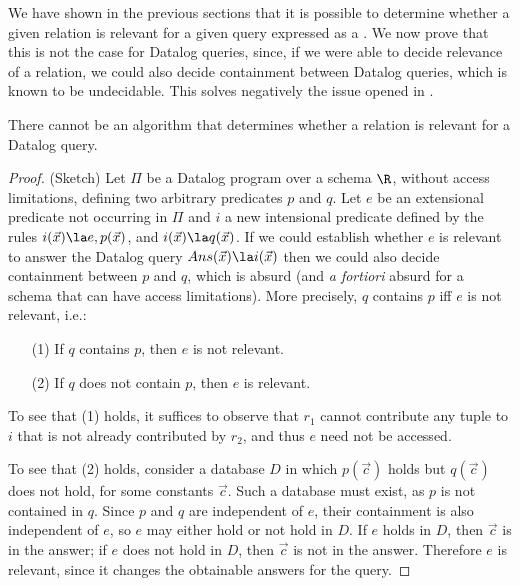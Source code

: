 We have shown in the previous sections that it is possible to determine whether a given relation is relevant for a given query expressed as a \UCQnot.
We now prove that this is not the case for Datalog queries, since, if we were able to decide relevance of a relation, we could also decide containment between Datalog queries, which is known to be undecidable.
This solves negatively the issue opened in \cite{LiCh01b}.

\begin{theorem}\label{the:relevant-datalog-undecidable}
There cannot be an algorithm that determines whether a relation is relevant for a Datalog query.
\end{theorem}
\begin{proof}(Sketch)
Let $\Pi$ be a Datalog program over a schema $\R$, without access limitations, defining two arbitrary predicates $p$ and $q$.
Let $e$ be an extensional predicate not occurring in $\Pi$ and $i$ a new intensional predicate defined by the rules 
$i(\vec x)\la e, p(\vec x)$, and $i(\vec x)\la q(\vec x)$.
%
If we could establish whether $e$ is relevant to answer the Datalog query
%
$Ans(\vec x) \la i(\vec x)$
%
then we could also decide containment between $p$ and $q$, which is absurd (and \emph{a fortiori} absurd for a schema that can have access limitations).
More precisely, $q$ contains $p$ iff $e$ is not relevant, i.e.:
\begin{enumerate}
\item[(1)] If $q$ contains $p$, then $e$ is not relevant.
\item[(2)] If $q$ does not contain $p$, then $e$ is relevant.
\end{enumerate}

To see that (1) holds, it suffices to observe that $r_1$ cannot contribute any tuple to $i$ that is not already contributed by $r_2$, and thus $e$ need not be accessed.

To see that (2) holds, consider a database $D$ in which $p(\vec c)$ holds but $q(\vec c)$ does not hold, for some constants $\vec c$. Such a database must exist, as $p$ is not contained in $q$.
Since $p$ and $q$ are independent of $e$, their containment is also independent of $e$, so $e$ may either hold or not hold in $D$. If $e$ holds in $D$, then $\vec c$ is in the answer; if $e$ does not hold in $D$, then $\vec c$ is not in the answer. Therefore $e$ is relevant, since it changes the obtainable answers for the query.
\end{proof}

